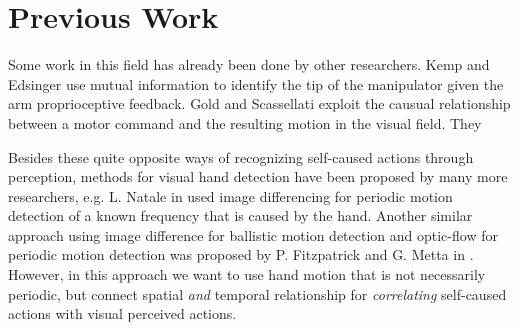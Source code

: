 \section{Previous Work}\label{prev-work}

Some work in this field has already been done by other researchers.
Kemp and Edsinger \cite{WCIC06new} use mutual information to 
identify the tip of the manipulator given the arm proprioceptive feedback.
Gold and Scassellati \cite{}exploit the causual relationship between 
a motor command and the resulting motion in the visual field. They 


Besides these quite opposite ways of recognizing self-caused actions through perception, methods for visual hand detection have been proposed by many more researchers, e.g. L. Natale in \cite{HRDAG04} used image differencing for periodic motion detection of a known frequency that is caused by the hand. Another similar approach using image difference for ballistic motion detection and optic-flow for periodic motion detection was proposed by P. Fitzpatrick and G. Metta in \cite{LAOTA03}. However, in this approach we want to use hand motion that is not necessarily periodic, but connect spatial \textit{and} temporal relationship for \textit{correlating} self-caused actions with visual perceived actions.\newline
